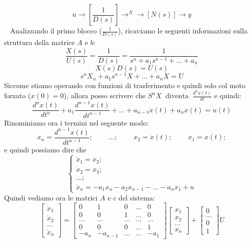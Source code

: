 \[
    u \rightarrow \left[\frac{1}{D(s)}\right] \rightarrow^X \rightarrow  \left[N(s)\right] \rightarrow  y
\]
\ \newline
Analizzando il primo blocco ($\frac{1}{D(s)}$), ricaviamo le seguenti informazioni sulla struttura della matrice $A$ e $b$:
\[
    \frac{X(s)}{U(s)} = \frac{1}{D(s)} = \frac{1}{ s^n + a_1 s^{n-1} + \dots + a_n }
\]
\[
    X(s) D(s) = U(s)
\]
\[
    s^n X_n + a_1 s^{n-1}X + \dots + a_n X = U
\]
Siccome stiamo operando con funzioni di trasferimento e quindi solo col moto forzato ($x(0) = 0$), allora posso scrivere che $S^n X \;\;\text{diventa}\;\; \frac{d^n x(t)}{dt}$ e quindi:
\[
    \frac{d^n x(t)}{dt^n} + a_1 \frac{d^{n-1} x(t)}{dt^{n-1}} + \dots + a_{n-1} \dot{x}(t) + a_n x(t) = u(t)
\]
Rinominiamo ora i termini nel seguente modo:
\[
    x_n = \frac{d^{n-1} x(t)}{dt^{n-1}}; \;\;\;\;\;\;\;\;\dots; \;\;\;\;\;\;\;\;x_2 = \dot{x}(t); \;\;\;\;\;\;\;\;x_1 = x(t);
\]
e quindi possiamo dire che 
\[
    \begin{cases}
        \dot{x}_1 = x_2;\\
        \dot{x}_2 = x_3;\\
        \dots;\\
        \dot{x}_n = -a_1 x_n - a_2 x_{n-1} - \dots - a_n x_1 + u
    \end{cases}
\]
Quindi vediamo ora le matrici $A$ e $c$ del sistema:
\[
    \left[\begin{matrix}
        \dot{x}_1\\
        \dot{x}_2\\
        \dots\\
        \dot{x}_n
    \end{matrix}\right] = \left[\begin{matrix}
        0 & 1 & 0 & \dots & 0 \\
        0 & 0 & 1 & \dots & 0 \\
        \dots & \dots &\dots&\dots&\dots\\
        0 & 0 & 0 & \dots & 1\\
        -a_n & -a_{n-1} & \dots & \dots & -a_1
    \end{matrix}\right] \left[\begin{matrix}
        x_1\\x_2\\\dots\\x_n
    \end{matrix}\right] + \left[\begin{matrix}
        0\\\dots\\0\\1
    \end{matrix}\right] U
\]
